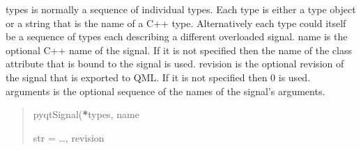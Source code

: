 \documentclass[letterpaper,10pt,english]{sphinxmanual}
\begin{document}
\begin{fulllineitems}
\begin{fulllineitems}
\sphinxAtStartPar
types is normally a sequence of individual types.  Each type is either a
type object or a string that is the name of a C++ type.  Alternatively
each type could itself be a sequence of types each describing a different
overloaded signal.
name is the optional C++ name of the signal.  If it is not specified then
the name of the class attribute that is bound to the signal is used.
revision is the optional revision of the signal that is exported to QML.
If it is not specified then 0 is used.
arguments is the optional sequence of the names of the signal’s arguments.
\begin{quote}\begin{description}
\sphinxAtStartPar
pyqtSignal({\color{red}\bfseries{}*}types, name

\sphinxAtStartPar
str = …, revision

\end{description}\end{quote}

\end{fulllineitems}


\end{fulllineitems}

\end{document}
